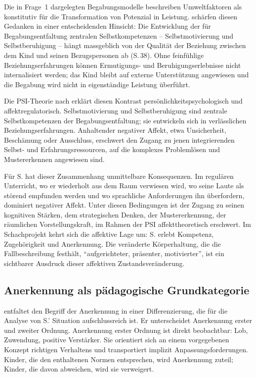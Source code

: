 \documentclass[ngerman, a4paper]{article}
\begin{document}
Die in Frage~1 dargelegten Begabungsmodelle beschreiben Umweltfaktoren als
konstitutiv für die Transformation von Potenzial in Leistung.
\textcite[S.\,38]{kuhl2019diversitaet}
schärfen diesen Gedanken in einer entscheidenden Hinsicht: Die Entwicklung
der für Begabungsentfaltung zentralen Selbstkompetenzen -- Selbstmotivierung
und Selbstberuhigung -- hängt massgeblich von der Qualität der Beziehung
zwischen dem Kind und seinen Bezugspersonen ab (S.\,38). Ohne feinfühlige
Beziehungserfahrungen können Ermutigungs- und Beruhigungserlebnisse nicht
internalisiert werden; das Kind bleibt auf externe Unterstützung angewiesen
und die Begabung wird nicht in eigenständige Leistung überführt.

Die PSI-Theorie nach \textcite[S.\,38,\,47]{kuhl2019diversitaet}
erklärt diesen Kontrast persönlichkeitspsychologisch und
affektregulatorisch. Selbstmotivierung und Selbstberuhigung sind zentrale
Selbstkompetenzen der Begabungsentfaltung; sie entwickeln sich in
verlässlichen Beziehungserfahrungen. Anhaltender negativer Affekt,
etwa Unsicherheit, Beschämung oder Ausschluss, erschwert den Zugang zu
jenen integrierenden Selbst- und Erfahrungsressourcen, auf die komplexes
Problemlösen und Mustererkennen angewiesen sind.

Für S. hat dieser Zusammenhang unmittelbare Konsequenzen. Im regulären Unterricht,
wo er wiederholt aus dem Raum verwiesen wird, wo seine Laute als störend empfunden
werden und wo sprachliche Anforderungen ihn überfordern, dominiert negativer Affekt.
Unter diesen Bedingungen ist der Zugang zu seinen kognitiven Stärken, dem
strategischen Denken, der Mustererkennung, der räumlichen Vorstellungskraft,
im Rahmen der PSI affekttheoretisch erschwert. Im Schachprojekt kehrt sich die affektive Lage um:
S. erlebt Kompetenz, Zugehörigkeit und Anerkennung. Die veränderte Körperhaltung,
die die Fallbeschreibung festhält, \enquote{aufgerichteter, präsenter, motivierter},
ist ein sichtbarer Ausdruck dieser affektiven Zustandsveränderung.

\subsection{Anerkennung als pädagogische Grundkategorie}

\textcite[S.\,89\psq]{grossrieder2010anerkennung} entfaltet den Begriff
der Anerkennung in einer Differenzierung, die für
die Analyse von S.' Situation aufschlussreich ist. Er unterscheidet Anerkennung
erster und zweiter Ordnung. Anerkennung erster Ordnung ist direkt beobachtbar: Lob,
Zuwendung, positive Verstärker. Sie orientiert sich an einem vorgegebenen Konzept
richtigen Verhaltens und transportiert implizit Anpassungsforderungen. Kinder, die den
enthaltenen Normen entsprechen, wird Anerkennung zuteil; Kinder, die davon abweichen,
wird sie verweigert.
\end{document}
